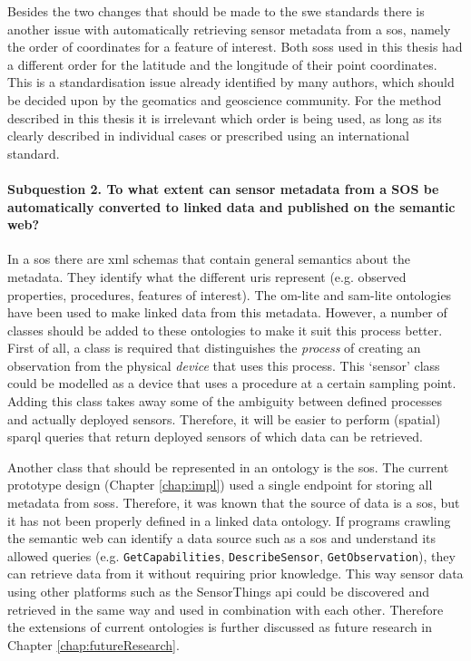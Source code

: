 Besides the two changes that should be made to the \ac{swe} standards there is another issue with automatically retrieving sensor metadata from a \ac{sos}, namely the order of coordinates for a feature of interest. Both \aclp{sos} used in this thesis had a different order for the latitude and the longitude of their point coordinates. This is a standardisation issue already identified by many authors, which should be decided upon by the geomatics and geoscience community. For the method described in this thesis it is irrelevant which order is being used, as long as its clearly described in individual cases or prescribed using an international standard.

\paragraph{\textbf{Subquestion 2.} To what extent can sensor metadata from a SOS be automatically converted to linked data and published on the semantic web?}\mbox{}

In a \ac{sos} there are \ac{xml} schemas that contain general semantics about the metadata. They identify what the different \acp{uri} represent (e.g. observed properties, procedures, features of interest). The om-lite and sam-lite ontologies have been used to make linked data from this metadata. However, a number of classes should be added to these ontologies to make it suit this process better. First of all, a class is required that distinguishes the \textit{process} of creating an observation from the physical \textit{device} that uses this process. This `sensor' class could be modelled as a device that uses a procedure at a certain sampling point. Adding this class takes away some of the ambiguity between defined processes and actually deployed sensors. Therefore, it will be easier to perform (spatial) \ac{sparql} queries that return deployed sensors of which data can be retrieved.  

Another class that should be represented in an ontology is the \acl{sos}. The current prototype design (Chapter \ref{chap:impl}) used a single endpoint for storing all metadata from \aclp{sos}. Therefore, it was known that the source of data is a \ac{sos}, but it has not been properly defined in a linked data ontology. If programs crawling the semantic web can identify a data source such as a \ac{sos} and understand its allowed queries (e.g. \texttt{GetCapabilities}, \texttt{DescribeSensor}, \texttt{GetObservation}), they can retrieve data from it without requiring prior knowledge. This way sensor data using other platforms such as the SensorThings \ac{api} could be discovered and retrieved in the same way and used in combination with each other. Therefore the extensions of current ontologies is further discussed as future research in Chapter \ref{chap:futureResearch}.  

